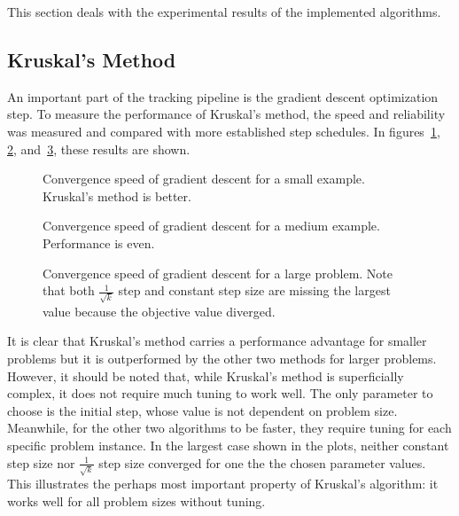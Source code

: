 This section deals with the experimental results of the implemented algorithms. 

\subsection{Kruskal's Method}
An important part of the tracking pipeline is the gradient descent optimization step. To measure the performance of Kruskal's method, the speed and reliability was measured and compared with more established step schedules. In figures~\ref{fig:convergence-comp-small}, \ref{fig:convergence-comp-medium}, and~\ref{fig:convergence-comp-large}, these results are shown. 
\begin{figure}[ht]
    \centering
    
    \caption{Convergence speed of gradient descent for a small example. Kruskal's method is better. }
    \label{fig:convergence-comp-small}
\end{figure}
\begin{figure}[ht]
    \centering
    
    \caption{Convergence speed of gradient descent for a medium example. Performance is even. }
    \label{fig:convergence-comp-medium}
\end{figure}
\begin{figure}[ht]
    \centering
    
    \caption{Convergence speed of gradient descent for a large problem. Note that both $\frac{1}{\sqrt{k}}$ step and constant step size are missing the largest value because the objective value diverged.}
    \label{fig:convergence-comp-large}
\end{figure}
It is clear that Kruskal's method carries a performance advantage for smaller problems but it is outperformed by the other two methods for larger problems. However, it should be noted that, while Kruskal's method is superficially complex, it does not require much tuning to work well. The only parameter to choose is the initial step, whose value is not dependent on problem size. Meanwhile, for the other two algorithms to be faster, they require tuning for each specific problem instance. In the largest case shown in the plots, neither constant step size nor $\frac{1}{\sqrt{k}}$ step size converged for one the the chosen parameter values. This illustrates the perhaps most important property of Kruskal's algorithm: it works well for all problem sizes without tuning. 

